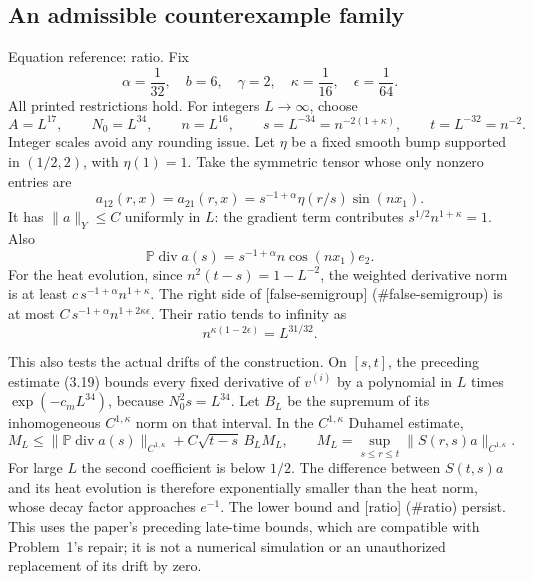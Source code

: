 \documentclass[10pt]{article}
\begin{document}
\subsection*{An admissible counterexample family}
Equation reference: ratio. Fix \[\alpha=\frac1{32},\quad b=6,\quad \gamma=2,\quad
 \kappa=\frac1{16},\quad \epsilon=\frac1{64}.\] All printed restrictions hold. For integers \(L\to\infty\), choose \[A=L^{17},\qquad N_0=L^{34},\qquad
 n=L^{16},\qquad s=L^{-34}=n^{-2(1+\kappa)},\qquad
 t=L^{-32}=n^{-2}.\] Integer scales avoid any rounding issue. Let \(\eta\) be a fixed smooth bump supported in \((1/2,2)\), with \(\eta(1)=1\). Take the symmetric tensor whose only nonzero entries are \[a_{12}(r,x)=a_{21}(r,x)=s^{-1+\alpha}\eta(r/s)\sin(nx_1).\] It has \(\|a\|_Y\leq C\) uniformly in \(L\): the gradient term contributes \(s^{1/2}n^{1+\kappa}=1\). Also \[\mathbb P\operatorname{div}a(s)=s^{-1+\alpha}n\cos(nx_1)e_2.\] For the heat evolution, since \(n^2(t-s)=1-L^{-2}\), the weighted derivative norm is at least \(c\,s^{-1+\alpha}n^{1+\kappa}\). The right side of [false-semigroup] (\#false-semigroup) is at most \(C\,s^{-1+\alpha}n^{1+2\kappa\epsilon}\). Their ratio tends to infinity as \[
 n^{\kappa(1-2\epsilon)}=L^{31/32}.\]\par
This also tests the actual drifts of the construction. On \([s,t]\), the preceding estimate (3.19) bounds every fixed derivative of \(v^{(i)}\) by a polynomial in \(L\) times \(\exp(-c_mL^{34})\), because \(N_0^2s=L^{34}\). Let \(B_L\) be the supremum of its inhomogeneous \(C^{1,\kappa}\) norm on that interval. In the \(C^{1,\kappa}\) Duhamel estimate, \[M_L\leq\|\mathbb P\operatorname{div}a(s)\|_{C^{1,\kappa}}
             +C\sqrt{t-s}\,B_LM_L,
 \qquad M_L=\sup_{s\leq r\leq t}\|S(r,s)a\|_{C^{1,\kappa}}.\] For large \(L\) the second coefficient is below \(1/2\). The difference between \(S(t,s)a\) and its heat evolution is therefore exponentially smaller than the heat norm, whose decay factor approaches \(e^{-1}\). The lower bound and [ratio] (\#ratio) persist. This uses the paper’s preceding late-time bounds, which are compatible with Problem 1’s repair; it is not a numerical simulation or an unauthorized replacement of its drift by zero.\par
\end{document}
